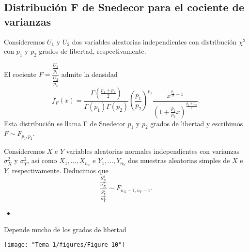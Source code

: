 \subsection{Distribución F de Snedecor para el cociente de varianzas}
\begin{tcolorbox}[colback=blue!5!white, colframe=blue!75!black, title=\textbf{Proposición}]
Consideremos $U_1$ y $U_2$ dos variables aleatorias independientes con distribución $\chi^2$ con $p_1$ y $p_2$ grados de libertad, respectivamente.

El cociente $F=\dfrac{\frac{U_1}{p_1} }{\frac{U_2}{p_2}}$ admite la densidad \[
  f_F(x)=\dfrac{\Gamma\left( \frac{p_1+p_2}{2}  \right) }{\Gamma(p_1)\Gamma(p_2)}\left( \dfrac{p_1}{p_2} \right) ^{p_1}\dfrac{x^{\frac{p_{1}}{2 }-1}}{\left( 1+\frac{p_1}{p_2} x \right) ^{\frac{p_1+p_2}{2} }}.
\] Esta distribución se llama F de Snedecor $p_1$ y $p_2$ grados de libertad y escribimos $F\sim F_{p_1,p_2}$.
\end{tcolorbox}
\begin{tcolorbox}[colback=blue!5!white, colframe=blue!75!black, title=\textbf{Consecuencia}]
Consideremos $X$ e $Y$ variables aleatorias normales independientes con varianzas $\sigma_X^2$ y $\sigma_Y^2$, así como $X_1,\dots,X_{n_x}$ e $Y_1,\dots,Y_{n_Y}$ dos muestras aleatorias simples de $X$ e $Y$, respectivamente. Deducimos que \[
  \dfrac{\frac{S_X^2}{\sigma_X^2}}{\frac{S_Y^2}{\sigma_Y^2} }\sim F_{n_X-1,n_Y-1}.
\] 
\end{tcolorbox}
\begin{itemize}[label=\color{red}\textbullet, leftmargin=*]
  \item {}
\end{itemize}
Depende mucho de los grados de libertad

\begin{center}
  \texttt{[image: "Tema 1/figures/Figure 10"]}
\end{center}
